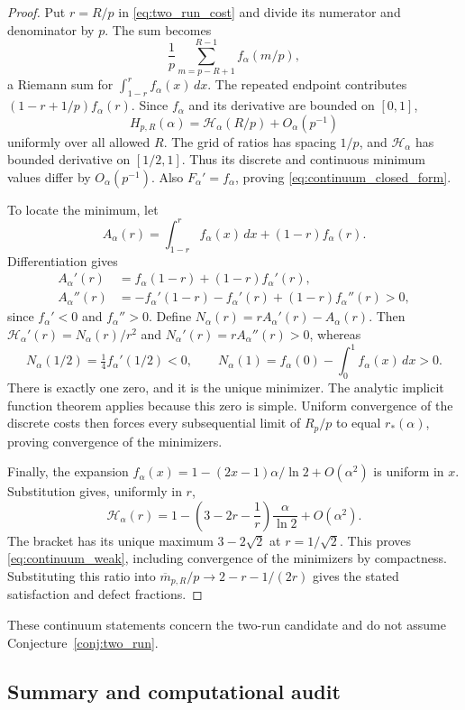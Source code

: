 \documentclass[11pt,a4paper]{article}
\begin{document}
\begin{proof}
Put $r=R/p$ in \eqref{eq:two_run_cost} and divide its numerator
and denominator by $p$.  The sum becomes
\[
    \frac1p\sum_{m=p-R+1}^{R-1}f_\alpha(m/p),
\]
a Riemann sum for $\int_{1-r}^{r}f_\alpha(x)\,dx$.
The repeated endpoint contributes
$(1-r+1/p)f_\alpha(r)$.
Since $f_\alpha$ and its derivative are bounded on $[0,1]$,
\[
    H_{p,R}(\alpha)=\mathcal H_\alpha(R/p)+O_\alpha(p^{-1})
\]
uniformly over all allowed $R$.  The grid of ratios has spacing
$1/p$, and $\mathcal H_\alpha$ has bounded derivative on $[1/2,1]$.
Thus its discrete and continuous minimum values differ by
$O_\alpha(p^{-1})$.  Also $F_\alpha'=f_\alpha$, proving
\eqref{eq:continuum_closed_form}.

To locate the minimum, let
\[
    A_\alpha(r)=\int_{1-r}^{r}f_\alpha(x)\,dx+(1-r)f_\alpha(r).
\]
Differentiation gives
\begin{align*}
    A_\alpha'(r)&=f_\alpha(1-r)+(1-r)f_\alpha'(r),\\
    A_\alpha''(r)&=-f_\alpha'(1-r)-f_\alpha'(r)
                      +(1-r)f_\alpha''(r)>0,
\end{align*}
since $f_\alpha'<0$ and $f_\alpha''>0$.
Define $N_\alpha(r)=rA_\alpha'(r)-A_\alpha(r)$.  Then
$\mathcal H_\alpha'(r)=N_\alpha(r)/r^2$ and
$N_\alpha'(r)=rA_\alpha''(r)>0$, whereas
\[
    N_\alpha(1/2)=\tfrac14 f_\alpha'(1/2)<0,\qquad
    N_\alpha(1)=f_\alpha(0)-\int_0^1 f_\alpha(x)\,dx>0.
\]
There is exactly one zero, and it is the unique minimizer.
The analytic implicit function theorem applies because this zero is
simple.  Uniform convergence of the discrete costs then forces every
subsequential limit of $R_p/p$ to equal $r_*(\alpha)$, proving
convergence of the minimizers.

Finally, the expansion
$f_\alpha(x)=1-(2x-1)\alpha/\ln2+O(\alpha^2)$ is uniform in $x$.
Substitution gives, uniformly in $r$,
\[
    \mathcal H_\alpha(r)=
    1-\left(3-2r-\frac1r\right)\frac{\alpha}{\ln2}+O(\alpha^2).
\]
The bracket has its unique maximum $3-2\sqrt2$ at $r=1/\sqrt2$.
This proves \eqref{eq:continuum_weak}, including convergence of the
minimizers by compactness.  Substituting this ratio into
$\overline m_{p,R}/p\to2-r-1/(2r)$ gives the stated satisfaction
and defect fractions.
\end{proof}

These continuum statements concern the two-run candidate and do not
assume Conjecture~\ref{conj:two_run}.

\subsection{Summary and computational audit}
\end{document}
